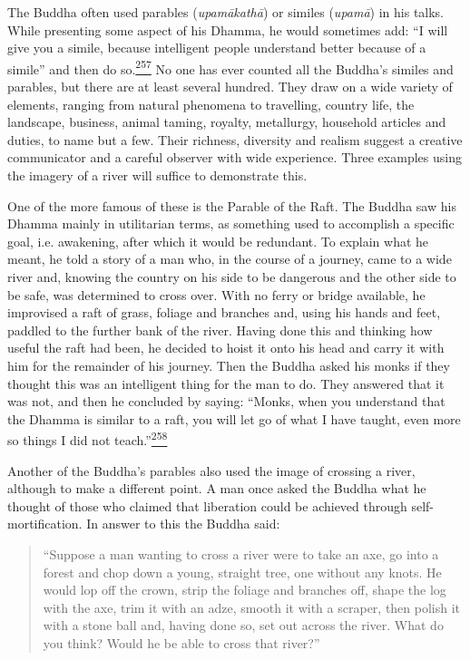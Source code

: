 The Buddha often used parables (\emph{upamākathā}) or similes
(\emph{upamā}) in his talks. While presenting some aspect of his Dhamma,
he would sometimes add: ``I will give you a simile, because intelligent
people understand better because of a simile'' and then do
so.\label{footprints_split_010.html_fnref257}\hyperref[footprints_split_024.htmlux5cux23fn257]{\textsuperscript{257}}
No one has ever counted all the Buddha's similes and parables, but there
are at least several hundred. They draw on a wide variety of elements,
ranging from natural phenomena to travelling, country life, the
landscape, business, animal taming, royalty, metallurgy, household
articles and duties, to name but a few. Their richness, diversity and
realism suggest a creative communicator and a careful observer with wide
experience. Three examples using the imagery of a river will suffice to
demonstrate this.

One of the more famous of these is the Parable of the Raft. The Buddha
saw his Dhamma mainly in utilitarian terms, as something used to
accomplish a specific goal, i.e. awakening, after which it would be
redundant. To explain what he meant, he told a story of a man who, in
the course of a journey, came to a wide river and, knowing the country
on his side to be dangerous and the other side to be safe, was
determined to cross over. With no ferry or bridge available, he
improvised a raft of grass, foliage and branches and, using his hands
and feet, paddled to the further bank of the river. Having done this and
thinking how useful the raft had been, he decided to hoist it onto his
head and carry it with him for the remainder of his journey. Then the
Buddha asked his monks if they thought this was an intelligent thing for
the man to do. They answered that it was not, and then he concluded by
saying: ``Monks, when you understand that the Dhamma is similar to a
raft, you will let go of what I have taught, even more so things I did
not
teach.''\label{footprints_split_010.html_fnref258}\hyperref[footprints_split_024.htmlux5cux23fn258]{\textsuperscript{258}}

Another of the Buddha's parables also used the image of crossing a
river, although to make a different point. A man once asked the Buddha
what he thought of those who claimed that liberation could be achieved
through self-mortification. In answer to this the Buddha said:

\begin{quote}
``Suppose a man wanting to cross a river were to take an axe, go into a
forest and chop down a young, straight tree, one without any knots. He
would lop off the crown, strip the foliage and branches off, shape the
log with the axe, trim it with an adze, smooth it with a scraper, then
polish it with a stone ball and, having done so, set out across the
river. What do you think? Would he be able to cross that river?''
\end{quote}

